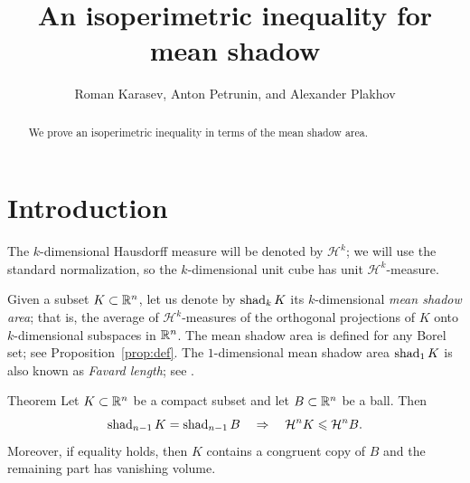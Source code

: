 \documentclass[a4paper,10pt]{article}
\def\thetitle{An isoperimetric inequality for mean shadow}
\def\theauthors{Roman Karasev, Anton Petrunin, and Alexander Plakhov}
\begin{document}
\title{\thetitle}
\author{\theauthors}
\date{}
\maketitle

\newcommand{\Addresses}{{\bigskip\footnotesize

\noindent  Roman Karasev,
\par\nopagebreak
\textsc{Institute for Information Transmission Problems RAS, Bolshoy Karetny per. 19, Moscow, Russia 127994.}

\medskip

\noindent   Anton Petrunin,
\par\nopagebreak
 \textsc{Math. Dept. PSU, University Park, PA 16802, USA.}

\medskip

\noindent Alexander Plakhov,
\par\nopagebreak
\textsc{Center for R{\&}D in Mathematics and Applications, Department of Mathematics, University of Aveiro, Portugal.}
\par\nopagebreak
\textsc{Institute for Information Transmission Problems RAS, Bolshoy Karetny per. 19, Moscow, Russia 127994.}

}}

\begin{abstract}
We prove an isoperimetric inequality in terms of the mean shadow area.
\end{abstract}

\section{Introduction}

The $k$-dimensional Hausdorff measure will be denoted by $\mathcal H^k$;
we will use the standard normalization, so the $k$-dimensional unit cube has unit $\mathcal H^k$-measure.

Given a subset $K\subset \mathbb{R}^n$, let us denote by $\mathop{\rm shad}\nolimits_k K$ its $k$-dimensional \emph{mean shadow area}; that is, the average of $\mathcal H^k$-measures of the orthogonal projections of $K$ onto $k$-dimensional subspaces in $\mathbb{R}^n$.
The mean shadow area is defined for any Borel set; see Proposition~\ref{prop:def}.
The $1$-dimensional mean shadow area $\mathop{\rm shad}\nolimits_1K$ is also known as \emph{Favard length}; see \cite{Laba2012,Damian2024}.

\begin{thm}{Theorem}\label{thm:main}
Let $K\subset \mathbb{R}^n$ be a compact subset and let $B\subset \mathbb{R}^n$ be a ball.
Then
\[
\mathop{\rm shad}\nolimits_{n-1}K= \mathop{\rm shad}\nolimits_{n-1}B
\quad\Rightarrow\quad
\mathcal H^n K\leqslant \mathcal H^n B.
\]
Moreover, if equality holds, then $K$ contains a congruent copy of $B$ and the remaining part has vanishing volume.
\end{thm}
\end{document}
